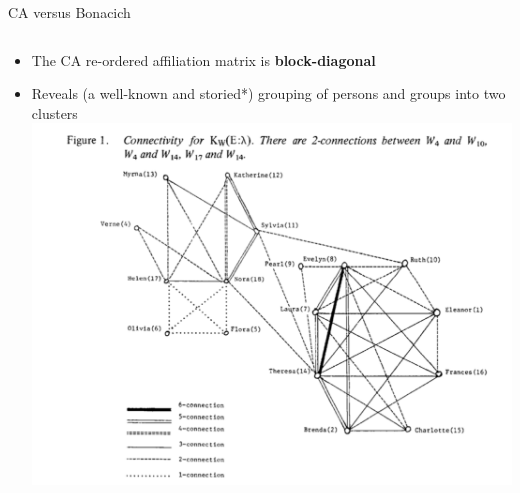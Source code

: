 \documentclass[
  ignorenonframetext,
]{beamer}
\providecommand{\tightlist}{%
  \setlength{\itemsep}{0pt}\setlength{\parskip}{0pt}}\usepackage{longtable,booktabs,array}
\begin{document}
\begin{frame}{CA versus Bonacich}
\begin{columns}[T]
\begin{column}{0.5\textwidth}
\begin{itemize}
\tightlist
\item
  The CA re-ordered affiliation matrix is \textbf{block-diagonal}
\item
  Reveals (a well-known and storied*) grouping of persons and groups
  into two clusters \includegraphics{Plots/doreian-sw.png}
\end{itemize}
\end{column}
\end{columns}
\end{frame}
\end{document}
